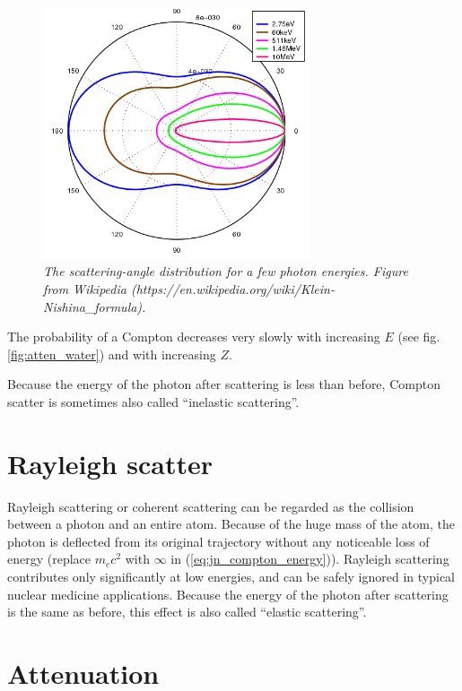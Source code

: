 \documentclass[11pt,oneside]{book}
\begin{document}
\begin{figure}[htb]
\centering
\includegraphics[bb=0 0 500 473,width=0.7\textwidth]{figs/fig_klein_nishina.png}
\caption{\label{fig:kleinnishina} \emph{The scattering-angle
    distribution for a few photon energies. Figure from Wikipedia
    (https://en.wikipedia.org/wiki/Klein-Nishina\_formula).}}
\end{figure}


The probability of a Compton decreases very slowly with increasing $E$
(see fig. \ref{fig:atten_water}) and with increasing $Z$.

Because the energy of the photon after scattering is less than before,
Compton scatter is sometimes also called ``inelastic scattering''.

\section{Rayleigh scatter}
Rayleigh scattering or coherent scattering can be regarded as the
collision between a photon and an entire atom. Because of the huge
mass of the atom, the photon is deflected from its original trajectory
without any noticeable loss of energy (replace $m_e c^2$ with $\infty$
in (\ref{eq:jn_compton_energy})). Rayleigh scattering contributes only
significantly at low energies, and can be safely ignored in typical nuclear
medicine applications. Because the energy of the photon after
scattering is the same as before, this effect is also called ``elastic
scattering''.

\section{Attenuation}
\end{document}
